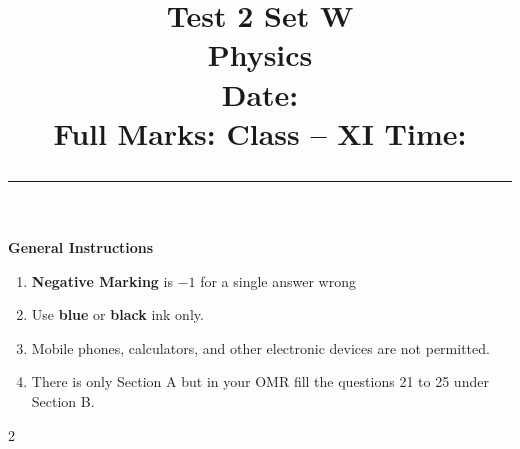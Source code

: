\documentclass[addpoints,12pt,a4paper]{exam}
\title{%
  \vspace{-1.5cm}%
  {\huge\textbf{Test 2 Set W}}\\[2mm]%
  {\LARGE Physics}\\[2mm]%
  {Date: {\datedate}}\\[3mm]%
  {\large \textbf{Full Marks: \numpoints} \hfill  Class -- XI \hfill \textbf{Time: \examduration}}%
  \vspace{3pt}%
  \hrule\vspace{-2em}%
}
\author{}
\date{}
\begin{document}
\maketitle

\vspace{0.2em}

\begin{center}
	\begin{tcolorbox}
		\begin{center}
			\textbf{\large{General Instructions}}
		\end{center}
		\begin{enumerate}
			\item \textbf{Negative Marking} is $-1$ for a single answer wrong
			\item Use \textbf{blue} or \textbf{black} ink only.
			\item Mobile phones, calculators, and other electronic devices are not permitted.
			\item There is only Section A but in your OMR fill the questions 21 to 25 under Section B.
		\end{enumerate}
		\vspace{0.2em}
	\end{tcolorbox}
\end{center}

\vspace{0.2em}

\begin{center}
\end{center}

\vspace{1pt}

\begin{multicols}{2}
\end{multicols}

\newpage
{}
\end{document}
